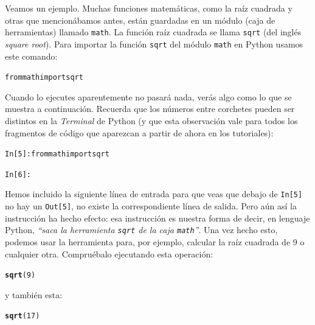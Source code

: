 \documentclass[10pt,a4paper]{article}\usepackage[]{graphicx}\usepackage[]{color}
\makeatletter
\newcommand{\hlnum}[1]{\textcolor[rgb]{0.686,0.059,0.569}{#1}}%
\newcommand{\hlstd}[1]{\textcolor[rgb]{0.345,0.345,0.345}{#1}}%
\newcommand{\hlkwd}[1]{\textcolor[rgb]{0.737,0.353,0.396}{\textbf{#1}}}%
\newenvironment{kframe}{%
 \def\at@end@of@kframe{}%
 \ifinner\ifhmode%
  \def\at@end@of@kframe{\end{minipage}}%
  \begin{minipage}{\columnwidth}%
 \fi\fi%
 \def\FrameCommand##1{\hskip\@totalleftmargin \hskip-\fboxsep
 \colorbox{shadecolor}{##1}\hskip-\fboxsep
     \hskip-\linewidth \hskip-\@totalleftmargin \hskip\columnwidth}%
 \MakeFramed {\advance\hsize-\width
   \@totalleftmargin\z@ \linewidth\hsize
   \@setminipage}}%
 {\par\unskip\endMakeFramed%
 \at@end@of@kframe}
\newenvironment{knitrout}{}{} %
\newcounter {cont01}
\makeatother
\begin{document}
Veamos un ejemplo. Muchas funciones matemáticas, como la raíz cuadrada y otras que mencionábamos antes, están guardadas en un módulo (caja de herramientas) llamado {\tt math}. La función raíz cuadrada se llama {\tt sqrt} (del inglés {\em square root}).  Para importar la función {\tt sqrt} del módulo {\tt math} en Python usamos este comando:
\begin{knitrout}
\color{fgcolor}\begin{kframe}
\begin{alltt}
from math import sqrt
\end{alltt}
\end{kframe}
\end{knitrout}
Cuando lo ejecutes aparentemente no pasará nada, verás algo como lo que se muestra a continuación. Recuerda que los números entre corchetes pueden ser distintos en la {\em Terminal} de Python (y que esta observación vale para todos los fragmentos de código que aparezcan a partir de ahora en los tutoriales):
\begin{knitrout}
\color{fgcolor}\begin{kframe}
\begin{alltt}
In [5]: from math import sqrt

In [6]:
\end{alltt}
\end{kframe}
\end{knitrout}
Hemos incluido la siguiente línea de entrada para que veas que debajo de {\tt In[5]} no hay un {\tt Out[5]},  no existe la correspondiente línea de salida. Pero aún así la instrucción ha hecho efecto: esa instrucción es nuestra forma de decir, en lenguaje Python, {\em ``saca la herramienta {\tt sqrt} de la caja {\tt math}''}. Una vez hecho esto, podemos usar la herramienta para, por ejemplo, calcular la raíz cuadrada de 9 o cualquier otra. Compruébalo ejecutando esta operación:
\begin{knitrout}
\color{fgcolor}\begin{kframe}
\begin{alltt}
\hlkwd{sqrt}\hlstd{(}\hlnum{9}\hlstd{)}
\end{alltt}
\end{kframe}
\end{knitrout}
y también esta:
\begin{knitrout}
\color{fgcolor}\begin{kframe}
\begin{alltt}
\hlkwd{sqrt}\hlstd{(}\hlnum{17}\hlstd{)}
\end{alltt}
\end{kframe}
\end{knitrout}
\end{document}
